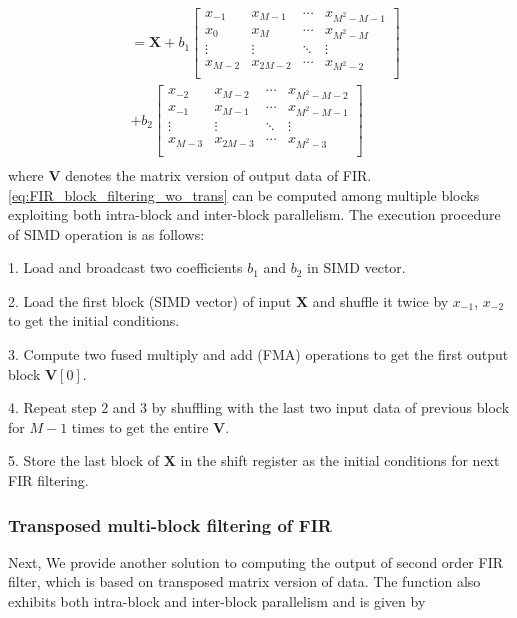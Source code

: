 \begin{equation}
\begin{aligned}
            &= \bm{X} + b_1\left[\begin{array}{c|c|c|c}
                x_{-1} & x_{M-1} & \cdots & x_{M^2-M-1} \\ 
                x_0 & x_M & \cdots & x_{M^2-M} \\
                \vdots & \vdots & \ddots & \vdots \\
                x_{M-2} & x_{2M-2} &\cdots & x_{M^2-2} \\
                \end{array}\right]  \\
            &+ b_2\left[\begin{array}{c|c|c|c}
                x_{-2} & x_{M-2} & \cdots & x_{M^2-M-2} \\ 
                x_{-1} & x_{M-1} & \cdots & x_{M^2-M-1} \\
                \vdots & \vdots & \ddots & \vdots \\
                x_{M-3} & x_{2M-3} &\cdots & x_{M^2-3} \\
                \end{array}\right]  \\
    \end{aligned}
\end{equation}
where $\bm{V}$ denotes the matrix version of output data of FIR.
\eqref{eq:FIR_block_filtering_wo_trans}
can be computed among multiple blocks exploiting both intra-block and inter-block parallelism. The execution
procedure of SIMD operation is as follows:

1. Load and broadcast two coefficients $b_1$ and $b_2$ in SIMD vector.

2. Load the first block (SIMD vector) of input $\bm{X}$ and shuffle it twice by $x_{-1}$, $x_{-2}$ to get
the initial conditions. 

3. Compute two fused multiply and add (FMA) operations to get the first output block $\bm{V}[0]$.

4. Repeat step 2 and 3 by shuffling with the last two input data of previous block for $M{-}1$ times 
to get the entire $\bm{V}$.

5. Store the last block of $\bm{X}$ in the shift register as the initial conditions for next FIR filtering.

\subsubsection{Transposed multi-block filtering of FIR}
Next, We provide another solution to computing the output of second order FIR filter, which is based on transposed
matrix version of data. The function also exhibits both intra-block and inter-block parallelism and is given by


